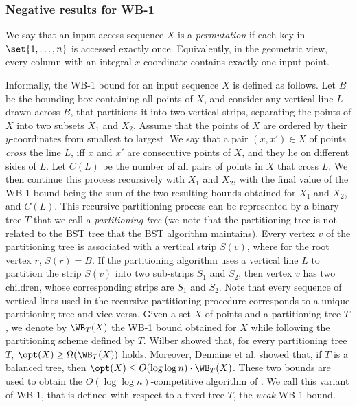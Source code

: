 \subsubsection{Negative results for WB-1}

We say that an input access sequence $X$ is a \emph{permutation} if each key in $\set{1,\ldots,n}$ is accessed exactly
once. Equivalently, in the geometric view, every column with an integral $x$-coordinate contains exactly one input point.

Informally, the WB-1 bound for an input sequence $X$ is defined as follows. Let $B$ be the bounding box containing all points of $X$, and consider any vertical line $L$ drawn across $B$, that partitions it into two vertical strips, separating the points of $X$ into two subsets $X_{1}$
and $X_{2}$. Assume that the points of $X$ are ordered by their $y$-coordinates from smallest to largest. We say that a pair $(x,x')\in X$ of points \emph{cross} the line $L$, iff $x$ and $x'$ are consecutive points of $X$, and they lie on different sides of $L$. Let $C(L)$ be the number of all pairs of points in $X$ that cross $L$. We then continue this process recursively with $X_1$ and $X_2$, with the final value of the WB-1 bound being the sum of the two resulting bounds obtained for $X_1$ and $X_2$, and $C(L)$.
This recursive partitioning process can be represented by a binary tree $T$ that
we call a \emph{partitioning tree} (we note that the partitioning tree is not related to the BST tree that the BST algorithm maintains). 
Every vertex $v$ of the partitioning tree is associated with a vertical strip $S(v)$, where for the root vertex $r$, $S(r)=B$. If the partitioning algorithm uses a vertical line $L$ to partition the strip $S(v)$ into two sub-strips $S_1$ and $S_2$, then vertex $v$ has two children, whose corresponding strips are $S_1$ and $S_2$. Note that every sequence of vertical lines used in the recursive partitioning procedure corresponds to a unique partitioning tree and vice versa. 
Given a set  $X$ of points and a partitioning tree $T$, we denote  by $\WB_{T}(X)$ the WB-1 bound obtained for $X$ while following the partitioning scheme defined by $T$. Wilber \cite{wilber}
showed that, for every partitioning tree $T$, $\opt(X)\geq \Omega(\WB_{T}(X))$ holds. Moreover,  Demaine et al. \cite{tango} showed that, if $T$ is a balanced tree, then $\opt(X)\le O(\log\log n)\cdot \WB_{T}(X)$. These two bounds are used to obtain the $O(\log\log n)$-competitive algorithm of \cite{tango}. We call this variant of WB-1, that is defined with respect to a fixed tree $T$, the \emph{weak} WB-1 bound. 






